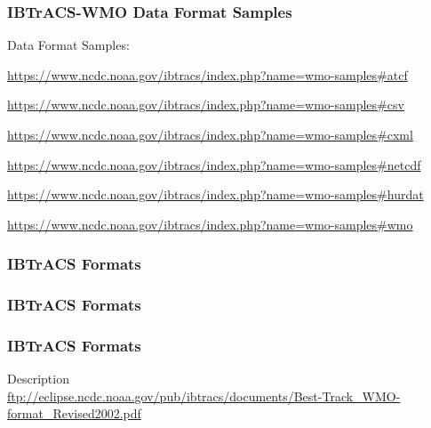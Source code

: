 \documentclass[12pt]{beamer}\usepackage[]{graphicx}\usepackage[]{color}
\begin{document}

\begin{frame}
\frametitle{IBTrACS-WMO Data Format Samples}

Data Format Samples:
\bi
  \item {\scriptsize \url{https://www.ncdc.noaa.gov/ibtracs/index.php?name=wmo-samples\#atcf}}
  \item {\scriptsize \url{https://www.ncdc.noaa.gov/ibtracs/index.php?name=wmo-samples\#csv}}
  \item {\scriptsize \url{https://www.ncdc.noaa.gov/ibtracs/index.php?name=wmo-samples\#cxml}}
  \item {\scriptsize \url{https://www.ncdc.noaa.gov/ibtracs/index.php?name=wmo-samples\#netcdf}}
  \item {\scriptsize \url{https://www.ncdc.noaa.gov/ibtracs/index.php?name=wmo-samples\#hurdat}}
  \item {\scriptsize \url{https://www.ncdc.noaa.gov/ibtracs/index.php?name=wmo-samples\#wmo}}
\ei

\end{frame}


\begin{frame}
\frametitle{IBTrACS Formats}
\begin{center}
\end{center}
\end{frame}


\begin{frame}
\frametitle{IBTrACS Formats}
\begin{center}
\end{center}
\end{frame}


\begin{frame}
\frametitle{IBTrACS Formats}
\begin{center}
\end{center}

{\scriptsize Description} \\
{\tiny \url{ftp://eclipse.ncdc.noaa.gov/pub/ibtracs/documents/Best-Track_WMO-format_Revised2002.pdf}}
\end{frame}
\end{document}
